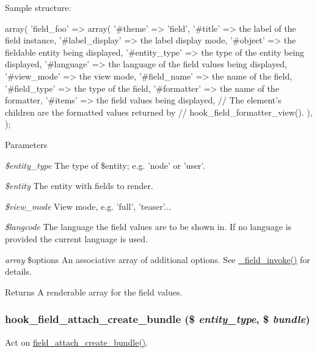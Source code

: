 Sample structure: 
\begin{DoxyCode}
 array(
   'field_foo' => array(
     '#theme' => 'field',
     '#title' => the label of the field instance,
     '#label_display' => the label display mode,
     '#object' => the fieldable entity being displayed,
     '#entity_type' => the type of the entity being displayed,
     '#language' => the language of the field values being displayed,
     '#view_mode' => the view mode,
     '#field_name' => the name of the field,
     '#field_type' => the type of the field,
     '#formatter' => the name of the formatter,
     '#items' => the field values being displayed,
     // The element's children are the formatted values returned by
     // hook_field_formatter_view().
   ),
 );
\end{DoxyCode}



\begin{DoxyParams}{Parameters}
\item[{\em \$entity\_\-type}]The type of \$entity; e.g. 'node' or 'user'. \item[{\em \$entity}]The entity with fields to render. \item[{\em \$view\_\-mode}]View mode, e.g. 'full', 'teaser'... \item[{\em \$langcode}]The language the field values are to be shown in. If no language is provided the current language is used. \item[{\em array}]\$options An associative array of additional options. See \hyperlink{group__field__attach_ga65f891a5eea6513f8505f5cfc5894896}{\_\-field\_\-invoke()} for details. \end{DoxyParams}
\begin{DoxyReturn}{Returns}
A renderable array for the field values. 
\end{DoxyReturn}
\hypertarget{group__field__attach_gad2e99b8b55c106c289a8241db00f0f30}{
\subsubsection[{hook\_\-field\_\-attach\_\-create\_\-bundle}]{\setlength{\rightskip}{0pt plus 5cm}hook\_\-field\_\-attach\_\-create\_\-bundle (\$ {\em entity\_\-type}, \/  \$ {\em bundle})}}
\label{group__field__attach_gad2e99b8b55c106c289a8241db00f0f30}
Act on \hyperlink{group__field__attach_gab3649772ef7a6416b013a4a556ce51bf}{field\_\-attach\_\-create\_\-bundle()}.

